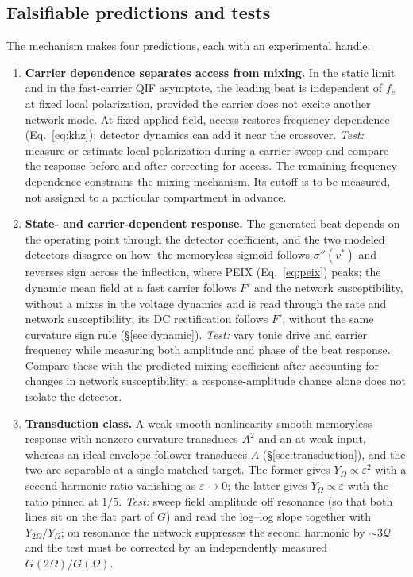 \documentclass[11pt,a4paper]{article}
\newcommand{\Sig}{\sigma}
\providecommand{\DIFaddtex}[1]{{\protect\color{blue} \sf #1}} %
\providecommand{\DIFdeltex}[1]{{\protect\color{red} \scriptsize #1}} %
\providecommand{\DIFaddbegin}{} %
\providecommand{\DIFaddend}{} %
\providecommand{\DIFdelbegin}{} %
\providecommand{\DIFdelend}{} %
\providecommand{\DIFadd}[1]{\texorpdfstring{\DIFaddtex{#1}}{#1}} %
\providecommand{\DIFdel}[1]{\texorpdfstring{\DIFdeltex{#1}}{}} %
\begin{document}
\subsection{Falsifiable predictions and tests}\label{sec:predictions}
The mechanism makes four predictions, each with an experimental handle.
\begin{enumerate}[leftmargin=*]
\item \textbf{Carrier dependence separates access from mixing.} In the static limit
and in the fast-carrier QIF asymptote, the leading beat is independent of $f_c$ at
fixed local polarization, provided the carrier does not excite another network mode.
At fixed applied field, access restores frequency dependence
(Eq.~\eqref{eq:khz}); detector dynamics can add it near the crossover.
\emph{Test:} measure or estimate local polarization during a carrier sweep and
compare the response before and after correcting for access. The remaining
frequency dependence constrains the mixing mechanism. Its cutoff is to be
measured, not assigned to a particular compartment in advance.
\item \textbf{State- and carrier-dependent response.} The generated beat depends on
the operating point through the detector coefficient, and the two modeled detectors
disagree on how: the memoryless sigmoid follows $\Sig''(v^*)$ and reverses sign across the
inflection, where PEIX (Eq.~\eqref{eq:peix}) peaks; the dynamic mean field at a fast
carrier \DIFdelbegin \DIFdel{follows $F'$ and the network susceptibility, without a }\DIFdelend \DIFaddbegin \DIFadd{mixes in the voltage dynamics and is read through the rate and network
susceptibility; its DC rectification follows $F'$, without the same curvature }\DIFaddend sign rule
(\S\ref{sec:dynamic}). \emph{Test:} vary tonic drive and carrier frequency while
measuring both amplitude and phase of the beat response. Compare these with the
predicted mixing coefficient after accounting for changes in network susceptibility;
a response-amplitude change alone does not isolate the detector.
\item \textbf{Transduction class.} A \DIFdelbegin \DIFdel{weak smooth nonlinearity }\DIFdelend \DIFaddbegin \DIFadd{smooth memoryless response with nonzero curvature
}\DIFaddend transduces $A^2$ \DIFdelbegin \DIFdel{and an }\DIFdelend \DIFaddbegin \DIFadd{at weak input, whereas an ideal }\DIFaddend envelope follower transduces $A$
(\S\ref{sec:transduction}), and the two are separable at a
single matched target. The former gives $Y_\Omega\propto\varepsilon^2$ with a second-harmonic
ratio vanishing as $\varepsilon\!\to\!0$; the latter gives $Y_\Omega\propto\varepsilon$ with
the ratio pinned at $1/5$. \emph{Test:} sweep field amplitude off resonance (so that both
lines sit on the flat part of $G$) and read the log--log slope together with
$Y_{2\Omega}/Y_\Omega$; on resonance the network suppresses the second harmonic by
$\sim3\mathcal{Q}$ and the test must be corrected by an independently measured
$G(2\Omega)/G(\Omega)$.


\end{enumerate}
\end{document}
